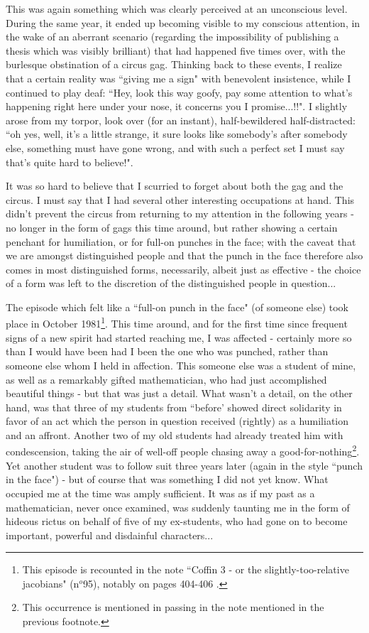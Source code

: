This was again something which was clearly perceived at an unconscious level. During the same year, it ended up becoming visible to my conscious attention, in the wake of an aberrant scenario (regarding the impossibility of publishing a thesis which was visibly brilliant) that had happened five times over, with the burlesque obstination of a circus gag. Thinking back to these events, I realize that a certain reality was ``giving me a sign" with benevolent insistence, while I continued to play deaf: ``Hey, look this way goofy, pay some attention to what's happening right here under your nose, it concerns you I promise...!!". I slightly arose from my torpor, look over (for an instant), half-bewildered half-distracted: ``oh yes, well, it's a little strange, it sure looks like somebody's after somebody else, something must have gone wrong, and with such a perfect set I must say that's quite hard to believe!".

It was so hard to believe that I scurried to forget about both the gag and the circus. I must say that I had several other interesting occupations at hand. This didn't prevent the circus from returning to my attention in the following years - no longer in the form of gags this time around, but rather showing a certain penchant for humiliation, or for full-on punches in the face; with the caveat that we are amongst distinguished people and that the punch in the face therefore also comes in most distinguished forms, necessarily, albeit just as effective - the choice of a form was left to the discretion of the distinguished people in question...

The episode which felt like a ``full-on punch in the face" (of someone else) took place in October 1981\footnote{This episode is recounted in the note ``Coffin 3 - or the slightly-too-relative jacobians" (n$^o$95), notably on pages 404-406
.}. This time around, and for the first time since frequent signs of a new spirit had started reaching me, I was affected - certainly more so than I would have been had I been the one who was punched, rather than someone else whom I held in affection. This someone else was a student of mine, as well as a remarkably gifted mathematician, who had just accomplished beautiful things - but that was just a detail. What wasn't a detail, on the other hand, was that three of my students from ``before' showed direct solidarity in favor of an act which the person in question received (rightly) as a humiliation and an affront. Another two of my old students had already treated him with condescension, taking the air of well-off people chasing away a good-for-nothing\footnote{This occurrence is mentioned in passing in the note mentioned in the previous footnote.}. Yet another student was to follow suit three years later (again in the style ``punch in the face") - but of course that was something I did not yet know. What occupied me at the time was amply sufficient. It was as if my past as a mathematician, never once examined, was suddenly taunting me in the form of hideous rictus on behalf of five of my ex-students, who had gone on to become important, powerful and disdainful characters...

